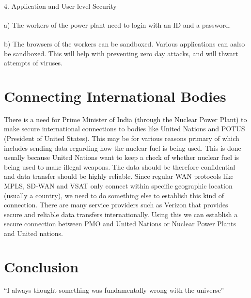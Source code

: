 \documentclass{article}
\begin{document}
\paragraph{}

4.  Application and User level Security\paragraph{}
a) The workers of the power plant need to login with an ID and a password. \paragraph{}
b) The browsers of the workers can be sandboxed. Various applications can aalso be sandboxed. This will help with preventing zero day attacks, and will thwart attempts of viruses.


\section{Connecting International Bodies}
There is a need for Prime Minister of India (through the Nuclear Power Plant) to make secure international connections to bodies like United Nations and POTUS (President of United States). This may be for various reasons primary of which includes sending data regarding how the nuclear fuel is being used. This is done usually because United Nations want to keep a check of whether nuclear fuel is being used to make illegal weapons. The data should be therefore confidential and data transfer should be highly reliable. Since regular WAN protocols like MPLS, SD-WAN and VSAT only connect within specific geographic location (usually a country), we need to do something else to establish this kind of connection. There are many service providers such as Verizon that provides secure and reliable data transfers internationally. Using this we can establish a secure connection between PMO and United Nations or Nuclear Power Plants and United nations.


\section{Conclusion}
``I always thought something was fundamentally wrong with the universe'' \citep{adams1995hitchhiker}



\end{document}
